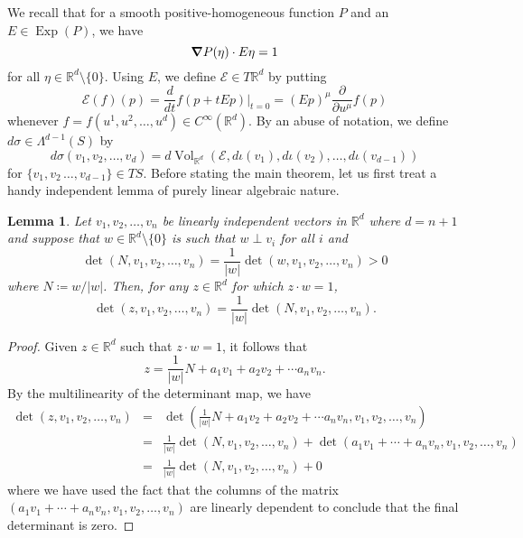 \documentclass{article}
\newcommand\Exp{\operatorname{Exp}}
\renewcommand\det{\operatorname{det}}
\newcommand{\p}{\partial}
\newcommand{\R}{\mathbb{R}}
\newcommand{\f}[2]{\frac{#1}{#2}}
\newcommand{\lp}{\left(}
\newcommand{\rp}{\right)}
\theoremstyle{theorem}
\newtheorem{lemma}[theorem]{Lemma}
\newcommand{\Vol}{\operatorname{Vol}}
\begin{document}
\noindent We recall that for a smooth positive-homogeneous function $P$ and an $E\in \Exp(P)$, we have
\begin{equation*}
    \grad P(\eta) \cdot E\eta = 1
\end{equation*}
for all $\eta\in \R^d\setminus\{0\}$. Using $E$, we define $\mathcal{E}\in T\mathbb{R}^d$ by putting
\begin{equation*}
\mathcal{E}(f)(p)=\frac{d}{dt}f(p+tEp)\big\vert_{t=0}= (Ep)^\mu \f{\p}{\p u^\mu} f(p)
\end{equation*}
whenever $f=f(u^1,u^2,\dots,u^d)\in C^{\infty}(\mathbb{R}^d)$. By an abuse of notation, we define $d\sigma\in \Lambda^{d-1}(S)$ by
\begin{equation*}
d\sigma(v_1,v_2,\dots,v_d)=d\Vol_{\mathbb{R}^d}(\mathcal{E},d\iota(v_1),d\iota(v_2),\dots,d\iota(v_{d-1}))
\end{equation*}
for $\{v_1,v_2\,\dots,v_{d-1}\}\in TS$. Before stating the main theorem, let us first treat a handy independent lemma of purely linear algebraic nature.

\begin{lemma}\label{prop:determinants}
Let $v_1,v_2,\dots,v_n$ be linearly independent vectors in $\mathbb{R}^d$ where $d=n+1$ and suppose that $w\in\mathbb{R}^d \setminus\{0\}$ is such that $w\perp v_i$ for all $i$ and 
\begin{equation*}
\det(N, v_1,v_2,\dots,v_n)=\frac{1}{|w|}\det(w,v_1,v_2,\dots,v_n)>0
\end{equation*}
where $N\coloneqq w/|w|$. Then, for any $z\in\mathbb{R}^d$ for which $z\cdot w=1$,
\begin{equation*}
\det(z, v_1,v_2,\dots,v_n)=\frac{1}{|w|}\det(N,v_1,v_2,\dots,v_n).
\end{equation*}
\end{lemma}

\begin{proof}
Given $z\in\mathbb{R}^d$ such that $z\cdot w=1$, it follows that 
\begin{equation*}
z=\frac{1}{|w|}N+a_1v_1+a_2v_2+\cdots a_nv_n.
\end{equation*}
By the multilinearity of the determinant map, we have
\begin{eqnarray*}
\det(z,v_1,v_2,\dots,v_n) &=&\det\lp \frac{1}{|w|}N+a_1v_2+a_2v_2+\cdots a_n v_n,v_1,v_2,\dots,v_n\rp\\
&=&\frac{1}{|w|}\det(N,v_1,v_2,\dots,v_n)+\det(a_1v_1+\cdots+a_n v_n, v_1,v_2,\dots,v_n)\\
&=&\frac{1}{|w|}\det(N, v_1,v_2,\dots,v_n)+0
\end{eqnarray*}
where we have used the fact that the columns of the matrix $(a_1v_1+\cdots+a_n v_n, v_1,v_2,\dots,v_n)$ are linearly dependent to conclude that the final determinant is zero.
\end{proof}
\end{document}
